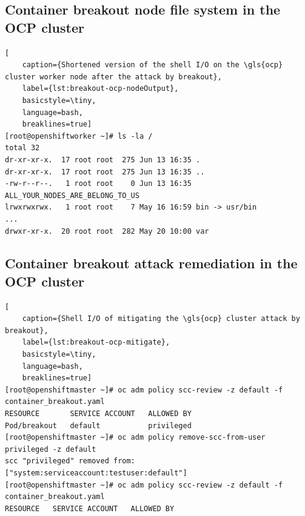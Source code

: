 \subsection{Container breakout node file system in the OCP cluster}

\begin{lstlisting}[
	caption={Shortened version of the shell I/O on the \gls{ocp} cluster worker node after the attack by breakout},
	label={lst:breakout-ocp-nodeOutput},
	basicstyle=\tiny,
	language=bash,
	breaklines=true]
[root@openshiftworker ~]# ls -la /
total 32
dr-xr-xr-x.  17 root root  275 Jun 13 16:35 .
dr-xr-xr-x.  17 root root  275 Jun 13 16:35 ..
-rw-r--r--.   1 root root    0 Jun 13 16:35 ALL_YOUR_NODES_ARE_BELONG_TO_US
lrwxrwxrwx.   1 root root    7 May 16 16:59 bin -> usr/bin
...
drwxr-xr-x.  20 root root  282 May 20 10:00 var
\end{lstlisting}

\subsection{Container breakout attack remediation in the OCP cluster}
\begin{lstlisting}[
	caption={Shell I/O of mitigating the \gls{ocp} cluster attack by breakout},
	label={lst:breakout-ocp-mitigate},
	basicstyle=\tiny,
	language=bash,
	breaklines=true]
[root@openshiftmaster ~]# oc adm policy scc-review -z default -f container_breakout.yaml
RESOURCE       SERVICE ACCOUNT   ALLOWED BY
Pod/breakout   default           privileged
[root@openshiftmaster ~]# oc adm policy remove-scc-from-user privileged -z default
scc "privileged" removed from: ["system:serviceaccount:testuser:default"]
[root@openshiftmaster ~]# oc adm policy scc-review -z default -f container_breakout.yaml
RESOURCE   SERVICE ACCOUNT   ALLOWED BY
\end{lstlisting}


